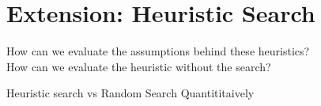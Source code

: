 \documentclass[12pt,a4paper,twoside,openany]{report} \usepackage[pdfborder={0 0 0}]{hyperref}    %
\theoremstyle{definition} \newtheorem{definition}{Definition}[section]
\begin{document}
%
%
  \section{Extension: Heuristic Search}
  \label{sec:evalExtension}
  How can we evaluate the assumptions behind these heuristics? \\
  How can we evaluate the heuristic without the search?

  Heuristic search vs Random Search Quantititaively \\
\end{document}
